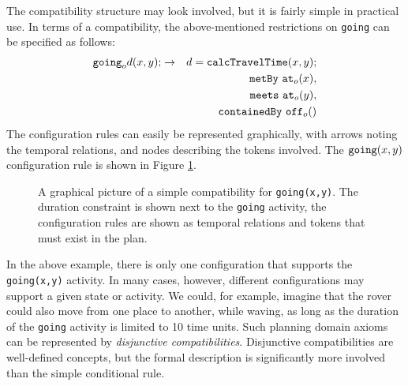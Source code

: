 The compatibility structure may look involved, but it is fairly simple
in practical use.  In terms of a compatibility, the above-mentioned
restrictions on {\tt going} can be specified as follows:
  \begin{eqnarray*} 
  {\tt going}_{o} d (x,y); 
  &\rightarrow & 
   d = {\tt calcTravelTime}(x,y); \\
  && {\tt metBy} \  {\tt at}_o(x), \\
  && {\tt meets} \  {\tt at}_o(y), \\
  && {\tt containedBy} \  {\tt off}_o() 
  \end{eqnarray*}
  The configuration rules can easily be represented graphically, with
arrows noting the temporal relations, and nodes describing the tokens
involved.  The ${\tt going}(x,y)$ configuration rule is shown in
Figure \ref{simpleCompatFig}.


\begin{figure}[btph]
\centerline{
}
\caption{\label{simpleCompatFig} A graphical picture of a simple
compatibility for {\tt going(x,y)}.  The duration constraint is shown
next to the {\tt going} activity, the configuration rules are shown as
temporal relations and tokens that must exist in the plan.}
\end{figure}

In the above example, there is only one configuration that supports
the {\tt going(x,y)} activity.  In many cases, however, different
configurations may support a given state or activity.  We could, for
example, imagine that the rover could also move from one place to
another, while waving, as long as the duration of the {\tt going}
activity is limited to 10 time units.  Such planning domain axioms can
be represented by {\em disjunctive compatibilities}.    Disjunctive 
compatibilities are well-defined concepts, but the formal description 
is significantly more involved than the simple conditional rule.


